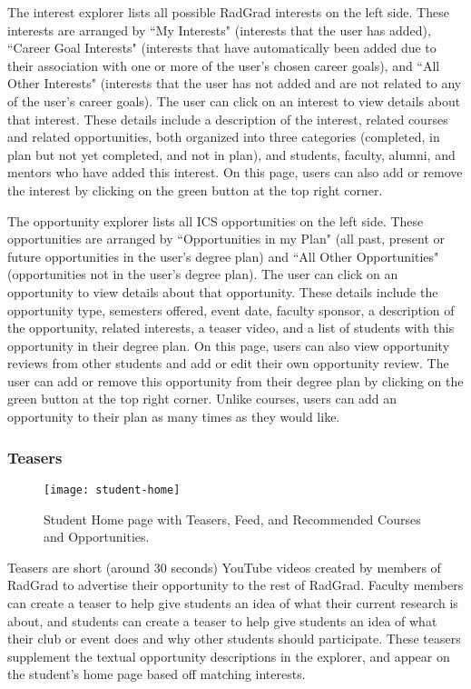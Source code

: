 The interest explorer lists all possible RadGrad interests on the left side. These interests are arranged by ``My Interests" (interests that the user has added), ``Career Goal Interests" (interests that have automatically been added due to their association with one or more of the user's chosen career goals), and ``All Other Interests" (interests that the user has not added and are not related to any of the user's career goals). The user can click on an interest to view details about that interest. These details include a description of the interest, related courses and related opportunities, both organized into three categories (completed, in plan but not yet completed, and not in plan), and students, faculty, alumni, and mentors who have added this interest. On this page, users can also add or remove the interest by clicking on the green button at the top right corner.

The opportunity explorer lists all ICS opportunities on the left side. These opportunities are arranged by ``Opportunities in my Plan" (all past, present or future opportunities in the user's degree plan) and ``All Other Opportunities" (opportunities not in the user's degree plan). The user can click on an opportunity to view details about that opportunity. These details include the opportunity type, semesters offered, event date, faculty sponsor, a description of the opportunity, related interests, a teaser video, and a list of students with this opportunity in their degree plan. On this page, users can also view opportunity reviews from other students and add or edit their own opportunity review. The user can add or remove this opportunity from their degree plan by clicking on the green button at the top right corner. Unlike courses, users can add an opportunity to their plan as many times as they would like.

\subsubsection{Teasers}
\begin{figure}[h]
\centering
\texttt{[image: student-home]}
\caption{Student Home page with Teasers, Feed, and Recommended Courses and Opportunities.}
\end{figure}
Teasers are short (around 30 seconds) YouTube videos created by members of RadGrad to advertise their opportunity to the rest of RadGrad. Faculty members can create a teaser to help give students an idea of what their current research is about, and students can create a teaser to help give students an idea of what their club or event does and why other students should participate. These teasers supplement the textual opportunity descriptions in the explorer, and appear on the student's home page based off matching interests.

